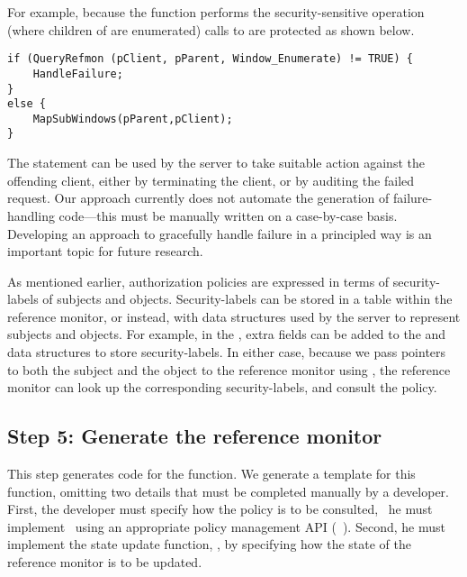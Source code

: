 For example, because the function  performs the
security-sensitive operation  (where children of
 are enumerated) calls to  are protected as
shown below.

\begin{center}
\newsavebox{\protectmapsubwindows}
\begin{lrbox}{\protectmapsubwindows}
\begin{minipage}[ht]{5.25in}
\begin{lstlisting}
if (QueryRefmon (pClient, pParent, Window_Enumerate) != TRUE) {
    HandleFailure;
}
else {
    MapSubWindows(pParent,pClient);
}
\end{lstlisting}
\end{minipage}
\end{lrbox}\fbox{\usebox{\protectmapsubwindows}}
\end{center}

The statement  can be used by the server to take
suitable action against the offending client, either by terminating the client,
or by auditing the failed request. Our approach currently does not automate the
generation of failure-handling code---this must be manually written on a
case-by-case basis. Developing an approach to gracefully handle failure in a
principled way is an important topic for future research.

As mentioned earlier, authorization policies are expressed in terms of
security-labels of subjects and objects.  Security-labels can be stored in a
table within the reference monitor, or instead, with data structures used
by the server to represent subjects and objects. For example, in the \xserver,
extra fields can be added to the  and  data
structures to store security-labels. In either case, because we pass pointers
to both the subject and the object to the reference monitor using
, the reference monitor can look up the corresponding
security-labels, and consult the policy.



\subsection{Step 5: Generate the reference monitor}
\label{chapter:overview:approach:step5}
%
This step generates code for the  function. We generate a
template for this function, omitting two details that must be completed
manually by a developer.  First, the developer must specify how the policy is
to be consulted, \ie~he must implement \return\ using an appropriate policy
management API (\eg~\cite{tresys1, tresys2}). Second, he must implement the
state update function, \update, by specifying how the state of the reference
monitor is to be updated.  

